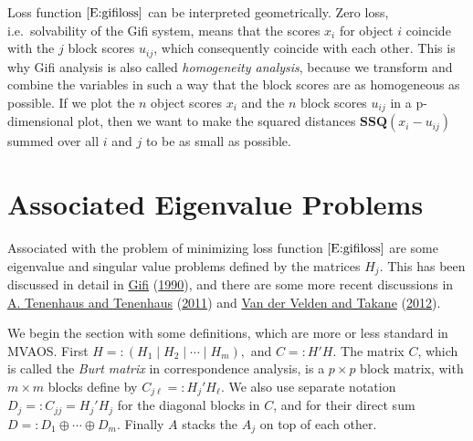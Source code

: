 \documentclass[
  12pt,
]{book}
\begin{document}
Loss function \(\eqref{E:gifiloss}\) can be interpreted geometrically. Zero loss, i.e.~solvability of the Gifi system, means that the scores \(x_i\) for object \(i\) coincide with the \(j\) block scores \(u_{ij}\), which consequently coincide with each other. This is why Gifi analysis is also called
\emph{homogeneity analysis}, because we transform and combine the variables in such a way that the block scores are as homogeneous as possible. If we plot the \(n\) object scores \(x_i\) and the \(n\) block scores \(u_{ij}\) in a p-dimensional plot, then we want to make the squared distances
\(\mathbf{SSQ}(x_i-u_{ij})\) summed over all \(i\) and \(j\) to be as small as possible.

\hypertarget{associated-eigenvalue-problems}{%
\section{Associated Eigenvalue Problems}\label{associated-eigenvalue-problems}}

Associated with the problem of minimizing loss function \(\eqref{E:gifiloss}\) are some eigenvalue and singular value problems defined by the matrices \(H_j\). This has been discussed in detail in \protect\hyperlink{ref-gifi_B_90}{Gifi} (\protect\hyperlink{ref-gifi_B_90}{1990}), and there are some more recent discussions in \protect\hyperlink{ref-tenenhaus_tenenhaus_11}{A. Tenenhaus and Tenenhaus} (\protect\hyperlink{ref-tenenhaus_tenenhaus_11}{2011}) and \protect\hyperlink{ref-vandervelden_takane_12}{Van der Velden and Takane} (\protect\hyperlink{ref-vandervelden_takane_12}{2012}).

We begin the section with some definitions, which are more or less standard in MVAOS. First \(H=:(H_1\mid H_2\mid\cdots\mid H_m),\) and
\(C=:H'H\). The matrix \(C\), which is called the \emph{Burt matrix} in correspondence analysis, is a \(p\times p\) block matrix, with \(m\times m\) blocks define by \(C_{j\ell}=:H_j'H_\ell\). We also use separate notation \(D_j=:C_{jj}=H_j'H_j\) for the diagonal blocks in \(C\), and for their direct sum \(D=:D_1\oplus\cdots\oplus D_m\). Finally \(A\) stacks the \(A_j\) on top of each other.
\end{document}
